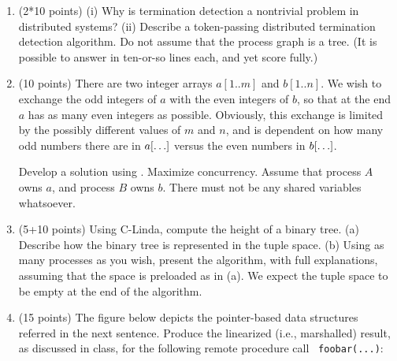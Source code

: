 \begin{enumerate}
\item (2*10 points)
(i) Why is termination detection a nontrivial problem in distributed
systems?  (ii) Describe a token-passing distributed termination
detection algorithm.  Do not assume that the process graph is a tree.
(It is possible to answer in ten-or-so lines each, and yet score
fully.)

\item (10 points)
There are two integer arrays $a[1..m]$ and $b[1..n]$.  We wish to
exchange the odd integers of $a$ with the even integers of $b$, so
that at the end $a$ has as many even integers as possible.  Obviously,
this exchange is limited by the possibly different values of $m$ and
$n$, and is dependent on how many odd numbers there are in
$a[\ldots]$ versus the even numbers in $b[\ldots]$.

Develop a solution using \CSP.  Maximize concurrency.  Assume that
process $A$ owns $a$, and process $B$ owns $b$.  There must not be any
shared variables whatsoever.

\item (5+10 points)
Using C-Linda, compute the height of a binary tree. (a) Describe how
the binary tree is represented in the tuple space.  (b) Using as many
processes as you wish, present the algorithm, with full explanations,
assuming that the space is preloaded as in (a).  We expect the tuple
space to be empty at the end of the algorithm.



\item (15 points)
The figure below depicts the pointer-based data structures referred in
the next sentence.  Produce the linearized (i.e., marshalled) result,
as discussed in class, for the following remote procedure call {\tt
foobar(...)}:\\


\end{enumerate}
